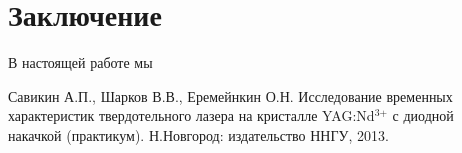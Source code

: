 \documentclass[a4paper,14pt]{extarticle}
\begin{document}
\section*{Заключение}
В настоящей работе мы 

\begin{thebibliography}{}

   Савикин А.П., Шарков В.В., Еремейнкин О.Н. Исследование временных характеристик твердотельного лазера на кристалле  YAG:Nd${}^{{3\texttt{+}}}$ с диодной накачкой (практикум). Н.Новгород: издательство ННГУ, 2013.

\end{thebibliography}
\end{document}
